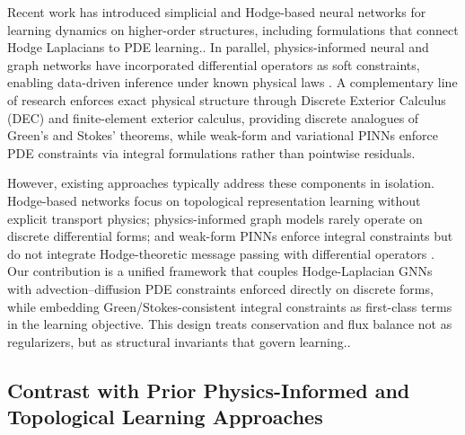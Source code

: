 \documentclass[10pt,article]{article}
\begin{document}
Recent work has introduced simplicial and Hodge-based neural networks for learning dynamics on higher-order structures, including formulations that connect Hodge Laplacians to PDE learning.\cite{lim2020hodge,chen2022bscnets}. In parallel, physics-informed neural and graph networks have incorporated differential operators as soft constraints, enabling data-driven inference under known physical laws \cite{raissi2019pinns,karniadakis2021physics}. A complementary line of research enforces exact physical structure through Discrete Exterior Calculus (DEC) and finite-element exterior calculus, providing discrete analogues of Green’s and Stokes’ theorems, while weak-form and variational PINNs enforce PDE constraints via integral formulations rather than pointwise residuals.

However, existing approaches typically address these components in isolation. Hodge-based networks focus on topological representation learning without explicit transport physics; physics-informed graph models rarely operate on discrete differential forms; and weak-form PINNs enforce integral constraints but do not integrate Hodge-theoretic message passing with differential operators \cite{shukla2022pignn,pfaff2021meshgraphnets}. Our contribution is a unified framework that couples Hodge-Laplacian GNNs with advection--diffusion PDE constraints enforced directly on discrete forms, while embedding Green/Stokes-consistent integral constraints as first-class terms in the learning objective. This design treats conservation and flux balance not as regularizers, but as structural invariants that govern learning\cite{trask2020data}..

\subsection{Contrast with Prior Physics-Informed and Topological Learning Approaches}
\end{document}
